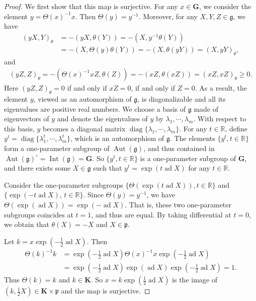\documentclass[10pt,a4paper]{amsart}
\begin{document}
\begin{proof}
    We first show that this map is surjective.
    For any $x\in \mathbf{G}$, we consider the element $y=\Theta(x)^{-1}x$.
    Then $\Theta(y)=y^{-1}$.
    Moreover, for any $X,Y,Z\in \mathfrak{g}$, we have 
    \begin{align*}
        (yX,Y)_{\theta}&=-(yX,\theta(Y))=-(X,y^{-1}\theta(Y))\\
        &=-(X,\Theta(y)\theta(Y))=-(X,\theta(yY))=(X,yY)_{\theta},
    \end{align*}
and
\begin{align*}
    (yZ,Z)_{\theta}=-(\Theta(x)^{-1}xZ,\theta(Z))=-(xZ,\theta(xZ))=(xZ,xZ)_{\theta}\geq 0.
\end{align*}
Here $ (yZ,Z)_{\theta}=0$ if and only if $xZ=0$, if and only if $Z=0$.
As a result, the element $y$, viewed as an automorphism of $\mathfrak{g}$, is diagonalizable and all its eigenvalues are positive real numbers.
We choose a basis of $\mathfrak{g}$ made of eigenvectors of $y$ and denote the eigenvalues of $y$ by $\lambda_1,\cdots,\lambda_m$.
With respect to this basis, $y$ becomes a diagonal matrix $\operatorname{diag}\{\lambda_1,\cdots,\lambda_m\}$.
For any $t\in \mathbb{R}$, define $y^t=\operatorname{diag}\{\lambda_1^t,\cdots,\lambda_m^t\}$, which is an automorphism of $\mathfrak{g}$.
The elements $\{y^t,t\in \mathbb{R}\}$ form a one-parameter subgroup of $\operatorname{Aut}(\mathfrak{g})$, and thus contained in $\operatorname{Aut}(\mathfrak{g})^{\circ}=\operatorname{Int}(\mathfrak{g})=\mathbf{G}$.
So $\{y^t,t\in \mathbb{R}\}$ is a one-parameter subgroup of $\mathbf{G}$, and there exists some $X\in \mathfrak{g}$ such that $y^t=\operatorname{exp}(t\operatorname{ad}X)$ for any $t\in \mathbb{R}$.

Consider the one-parameter subgroups $\{\Theta(\operatorname{exp}(t\operatorname{ad}X)),t\in \mathbb{R}\}$ and $\{\operatorname{exp}(-t\operatorname{ad}X)$, $t\in \mathbb{R}\}$. 
Since $\Theta(y)=y^{-1}$, we have $\Theta(\operatorname{exp}(\operatorname{ad}X))=\operatorname{exp}(-\operatorname{ad}X)$.
That is, these two one-parameter subgroups coincides at $t=1$, and thus are equal.
By taking differential at $t=0$, we obtain that $\theta(X)=-X$ and $X\in \mathfrak{p}$.

Let $k=x\operatorname{exp}(-\frac{1}{2}\operatorname{ad}X)$.
Then 
\begin{align*}
    \Theta(k)^{-1}k&=\operatorname{exp}(-\frac{1}{2}\operatorname{ad}X) \Theta(x)^{-1}x \operatorname{exp}(-\frac{1}{2}\operatorname{ad}X)\\
    &=\operatorname{exp}(-\frac{1}{2}\operatorname{ad}X)\operatorname{exp}(\operatorname{ad}X)\operatorname{exp}(-\frac{1}{2}\operatorname{ad}X)=1.
\end{align*}
Thus $\Theta(k)=k$ and $k\in \mathbf{K}$.
So $x=k\operatorname{exp}(\frac{1}{2}\operatorname{ad}X)$ is the image of $(k,\frac{1}{2}X)\in \mathbf{K}\times \mathfrak{p}$ and the map is surjective.


\end{proof}
\end{document}
